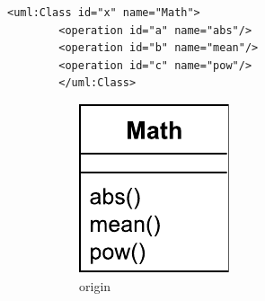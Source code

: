 \documentclass{jot}
\begin{document}
    \vspace{-15pt}
    \begin{minipage}[t]{0.61\linewidth} 
        \centering
        \begin{lstlisting}[style=eol,caption={The simplified XMI of the model in Fig. \ref{fig:origin}.},label=lst:originxmi]
        <uml:Class id="x" name="Math">
        <operation id="a" name="abs"/>
        <operation id="b" name="mean"/>
        <operation id="c" name="pow"/>
        </uml:Class>
        \end{lstlisting}
        \vspace{-10pt}
        \begin{figure}[H]
            \centering    
            \hfill
            \begin{subfigure}[t]{0.2\linewidth}
                \centering
                \includegraphics[width=\linewidth]{OriginalClassDiagram}
                \caption{origin}
                \label{fig:origin}
            \end{subfigure}
            \hfill
            \begin{subfigure}[t]{0.2\linewidth}
                \centering

\end{subfigure}
\end{figure}
\end{minipage}
\end{document}
